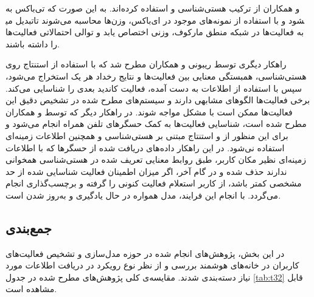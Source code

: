  و همکاران \cite{x3235} از ترکیب هستی‌شناسی و  استفاده کرده‌اند. به این صورت که تی‌باکس به  تبدیل می‎شود و با استفاده از نمونه‌های موجود در ای‌باکس، وزن‌ها محاسبه می‌شوند تا به فعالیت‌ها در شبکه منطق مارکوف، وزنی اختصاص یابد و توالی احتمالاتی فعالیت‌ها را داشته باشند.

راهکار دیگری توسط ریبونی و همکاران \cite{x3236} مطرح شد که با استفاده از استنتاج روی هستی‌شناسی، همبستگی معنایی بین فعالیت‌ها و نتایج رخداد هر یک استخراج می‌شود، سپس با استفاده از اطلاعات به دست آمده، فعالیت کاندید بعدی را شناسایی می‌کند.
برخی فعالیت‌ها الگوهای مشابهی دارند و سیستم‌های مطرح شده در تشخیص دقیق این فعالیت‌ها ممکن است با مشکل مواجه شوند. در راهکار دیگر که توسط  و همکاران \cite{x3237} مطرح شده است، شناسایی فعالیت‌ها به کمک حسگرهای تلفن همراه انجام می‌شود و برای این منظور از  و استنتاج مبتنی بر هستی‌شناسی و همچنین اطلاعات زمینه‌ای استفاده نی‌شود. در این راهکار داده‌های دریافت شده از حسگرها که با اطلاعات زمینه‌ای نظیر مکان کاربر، طبق روابط معنایی تعریف شده در هستی‌شناسی همخوانی ندارند حذف شده و در گام آخر، اگر میزان اطمینان فعالیت شناسایی شده از حد مشخصی کمتر باشد، از کاربر استعلام فعالیت کنونی را گرفته و برچسب‌گذاری انجام می‌گردد. با انجام این فرایند، مدل همواره در حال یادگیری و به‌روز شدن است.

\subsection{جمع‌بندی}

در این بخش، پژوهش‌های انجام شده در حوزه مدل‌سازی و تشخیص فعالیت‌های کاربران در خانه‌های هوشمند بررسی و از نظر نوع رویکرد در دریافت اطلاعات مورد نیاز دسته‌بندی شدند. مقایسه‌ی کلی پژوهش‌های مطرح شده در جدول \ref{tab:t32} قابل مشاهده است.

